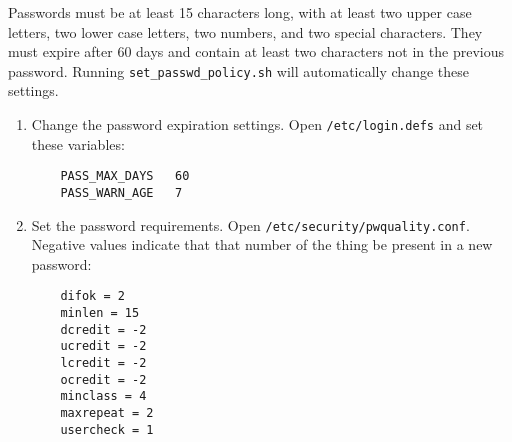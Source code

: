 Passwords must be at least 15 characters long, with at least two upper case letters, two lower case letters, two numbers, and two special characters. They must expire after 60 days and contain at least two characters not in the previous password. Running \texttt{set\_passwd\_policy.sh} will automatically change these settings.

\begin{enumerate}
\item Change the password expiration settings. Open \texttt{/etc/login.defs} and set these variables:
	\begin{verbatim}
	PASS_MAX_DAYS   60
	PASS_WARN_AGE   7
	\end{verbatim}

\item Set the password requirements. Open \texttt{/etc/security/pwquality.conf}. Negative values indicate that that number of the thing be present in a new password:
	\begin{verbatim}
	difok = 2
	minlen = 15
	dcredit = -2
	ucredit = -2
	lcredit = -2
	ocredit = -2
	minclass = 4
	maxrepeat = 2
	usercheck = 1
	\end{verbatim}

\end{enumerate}
